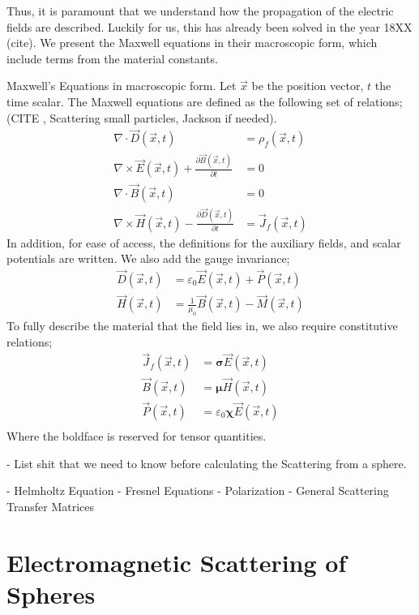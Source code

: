 Thus, it is paramount that we understand how the propagation of the electric fields are described. Luckily for us, this has already been solved in the year 18XX (cite). We present the Maxwell equations in their macroscopic form, which include terms from the material constants.
\begin{definition}
    Maxwell's Equations in macroscopic form. Let $\vec x$ be the position vector, $t$ the time scalar. The Maxwell equations are defined as the following set of relations; (CITE , Scattering small particles, Jackson if needed).
    \begin{align}
        \nabla \cdot \vec D(\vec{x},t) &= \rho_f(\vec{x},t) \\
        \nabla \times \vec E(\vec{x},t) + \frac{\partial \vec B(\vec{x},t)}{\partial t} &= 0 \\
        \nabla \cdot \vec B(\vec{x},t) &= 0 \\
        \nabla \times \vec H(\vec{x},t) - \frac{\partial \vec D(\vec{x},t)}{\partial t} &= \vec J_f(\vec{x},t)
    \end{align}
    In addition, for ease of access, the definitions for the auxiliary fields, and scalar potentials are written. We also add the gauge invariance;
    \begin{align}
        \vec D(\vec{x}, t) &= \varepsilon_0 \vec E(\vec{x},t) + \vec P (\vec{x},t) \\
\vec H (\vec{x},t) &= \frac{1}{\mu_0} \vec B(\vec{x},t) - \vec M(\vec{x},t)
    \end{align}
    To fully describe the material that the field lies in, we also require constitutive relations;
    \begin{align}
        \vec J_f(\vec{x},t) &= \mathbf{\sigma} \vec E (\vec{x},t)\\
        \vec B(\vec{x},t) &= \mathbf{\mu} \vec H (\vec{x},t)\\
        \vec P(\vec{x},t) &= \varepsilon_0\mathbf{\chi} \vec E (\vec{x},t)\\
    \end{align}
    Where the boldface is reserved for tensor quantities. 
\end{definition}

- List shit that we need to know before calculating the Scattering from a sphere.

- Helmholtz Equation
- Fresnel Equations
- Polarization
- General Scattering Transfer Matrices
\fi

\clearpage
\section{Electromagnetic Scattering of Spheres}


